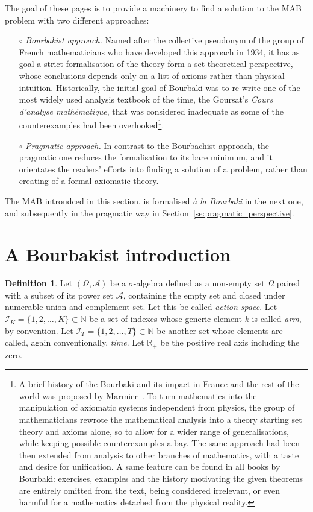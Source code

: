 \documentclass[]{scrartcl}
\theoremstyle{definition}
\newtheorem{definition}{Definition}[section]
\begin{document}
The goal of these pages is to provide a machinery to find a solution to the MAB problem with two different approaches:
\begin{itemize}
    \item[$\circ$] \emph{Bourbakist approach.} Named after the collective pseudonym of the group of French mathematicians who have developed this approach in 1934, it has as goal a strict formalisation of the theory form a set theoretical perspective, whose conclusions depends only on a list of axioms rather than physical intuition. Historically, the initial goal of Bourbaki was to re-write one of the most widely used analysis textbook of the time, the Goursat’s \emph{Cours d'analyse mathématique}, that was considered inadequate as some of the counterexamples had been overlooked\footnote{
        A brief history of the Bourbaki and its impact in France and the rest of the world was proposed by Marmier~\cite{marmier2014idea}. To turn mathematics into the manipulation of axiomatic systems independent from physics, the group of mathematicians rewrote the mathematical analysis into a theory starting set theory and axioms alone, so to allow for a wider range of generalisations, while keeping possible counterexamples a bay. The same approach had been then extended from analysis to other branches of mathematics, with a taste and desire for unification. A same feature can be found in all books by Bourbaki: exercises, examples and the history motivating the given theorems are entirely omitted from the text, being considered irrelevant, or even harmful for a mathematics detached from the physical reality.
    }. 
    \item[$\circ$] \emph{Pragmatic approach.} In contrast to the Bourbachist approach, the pragmatic one reduces the formalisation to its bare minimum, and it orientates the readers' efforts into finding a solution of a problem, rather than creating of a formal axiomatic theory.
\end{itemize}
The MAB introudced in this section, is formalised \emph{à la Bourbaki} in the next one, and subsequently in the pragmatic way in Section~\ref{se:pragmatic_perspective}.


\section{A Bourbakist introduction}
\label{se:bourbaki_perspective}

\begin{definition}
    Let $(\Omega, \mathcal{A})$ be a $\sigma$-algebra defined as a non-empty set $\Omega$ paired with a subset of its power set $\mathcal{A}$, containing the empty set and closed under numerable union and complement set. Let this be called \emph{action space}. Let $\mathcal{I}_{K} = \{1,2, \dots , K\} \subset \mathbb{N}$ be a set of indexes whose generic element $k$ is called \emph{arm}, by convention. Let $\mathcal{I}_{T} = \{1,2, \dots , T\} \subset \mathbb{N}$ be another set whose elements are called, again conventionally, \emph{time}. Let $\mathbb{R}_{+}$ be the positive real axis including the zero.
\end{definition}
\end{document}
